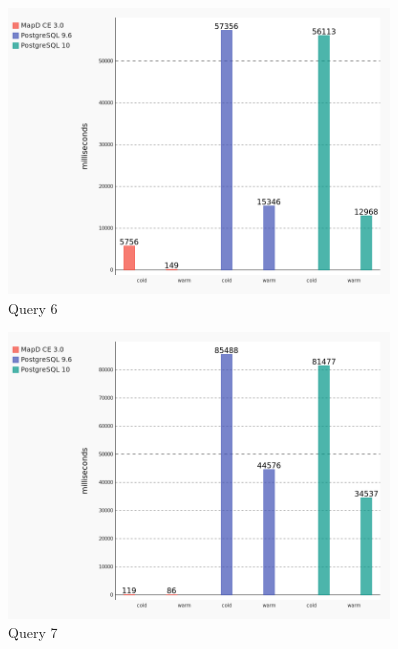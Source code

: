 \begin{figure}[H]
    \centering
    \includegraphics[width=0.9\textwidth,keepaspectratio]{charts/query_6.png}
    \caption{Query 6}
    \label{fig:query_6}
\end{figure}

\begin{figure}[H]
    \centering
    \includegraphics[width=0.9\textwidth,keepaspectratio]{charts/query_7.png}
    \caption{Query 7}
    \label{fig:query_7}
\end{figure}

